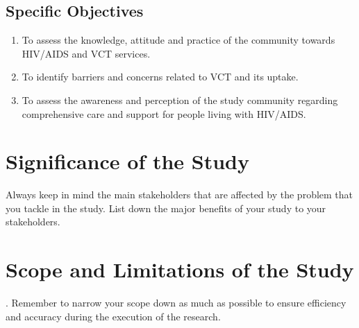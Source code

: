 \documentclass{strrespaper-trad}
\begin{document}
			\subsection{Specific Objectives}
				\begin{enumerate}
					\item To assess the knowledge, attitude and practice of the community towards HIV/AIDS and VCT services.
					\item To identify barriers and concerns related to VCT and its uptake.
					\item To assess the awareness and perception of the study community regarding comprehensive care and support for people living with HIV/AIDS.
				\end{enumerate}

		\section{Significance of the Study}

			Always keep in mind the main stakeholders that are affected by the problem that you tackle in the study.
			List down the major benefits of your study to your stakeholders.

		\section{Scope and Limitations of the Study}
			. Remember to narrow your scope down as much as possible to ensure efficiency and accuracy during the execution of the research.
\end{document}

